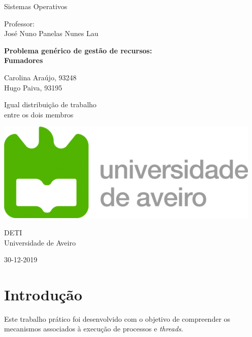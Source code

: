 \documentclass[10pt,portuguese]{article}
\begin{document}

\begin{titlepage}
	\clearpage\thispagestyle{empty}
	\centering
	\vspace{2cm}

	
	{\Large  Sistemas Operativos \par}
	\vspace{0.5cm}
	{\small Professor: \\
	José Nuno Panelas Nunes Lau\par}
	\vspace{4cm}
	{ \textbf{Problema genérico de gestão de recursos:}} \\
	\vspace{0.5cm}
	{\Huge \textbf{Fumadores}} \\
	\vspace{1cm}
	\vspace{4cm}
	{\normalsize Carolina Araújo, 93248 \\ 
	             Hugo Paiva, 93195
	   \par}
	   	{\tiny
	Igual distribuição de trabalho \\entre os dois membros\par}
	\vspace{2cm}

    \includegraphics[scale=0.20]{images/logo_ua.png}
    
    \vspace{2cm}
    
	{\normalsize DETI \\ 
		Universidade de Aveiro \par}
		
	{\normalsize 30-12-2019 \par}
	\vspace{2cm}
		
	
	\pagebreak

\end{titlepage}
\tableofcontents{}
\clearpage

\section{Introdução}
\par Este trabalho prático foi desenvolvido com o objetivo de compreender os mecanismos associados à execução de processos e \textit{threads}. 
\end{document}
